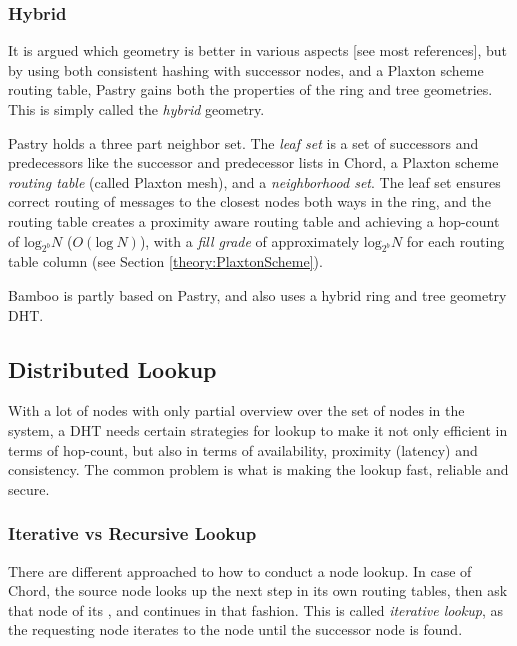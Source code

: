 \subsubsection{Hybrid}
\label{theory:Geometry:Hybrid}

It is argued which geometry is better in various aspects [see most references], but
 by using both consistent hashing with successor nodes, and a Plaxton scheme routing
 table, Pastry gains both the properties of the ring and
 tree geometries\cite{rowston-01-storage-past}. This is simply called the \emph{hybrid}
 geometry\cite{gummadi-03-impact-geometry}.

Pastry holds a three part neighbor set. The \emph{leaf set} is a set of successors and
 predecessors like the successor and predecessor lists in Chord, a Plaxton scheme
 \emph{routing table} (called Plaxton mesh), and a \emph{neighborhood set}.
 The leaf set ensures correct routing of messages to the closest nodes both ways in the ring,
 and the routing table creates a proximity aware routing table and achieving
 a hop-count of $\mathrm{log}_{2^b}N$ ($O(\mathrm{log\ }N)$), with a \emph{fill grade} of approximately
 $\mathrm{log}_{2^b}N$ for each routing table column (see Section \ref{theory:PlaxtonScheme}).

Bamboo is partly based on Pastry\cite{bamboo-homepage,rhea-04-handling-churn}, and
 also uses a hybrid ring and tree geometry DHT.


\subsection{Distributed Lookup}
\label{theory:Routing}

With a lot of nodes with only partial overview over the set of nodes in the system, a
 DHT needs certain strategies for lookup to make it not only efficient in terms of
 hop-count, but also in terms of availability, proximity (latency) and consistency.
 The common problem is what is making the lookup fast, reliable and secure.

\subsubsection{Iterative vs Recursive Lookup}

There are different approached to how to conduct a node lookup. In case of Chord, the
 source node looks up the next step in its own routing tables, then ask that node of
 its , and continues in that fashion. This is called \emph{iterative
 lookup}, as the requesting node iterates to the  node until the successor
 node is found\cite{rhea-04-handling-churn}.

